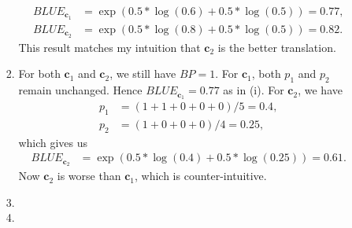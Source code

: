 \documentclass[12pt]{article}
\begin{document}
\begin{enumerate}[label=\textbf{\arabic*.}]
\begin{enumerate}[label=(\alph*)]
\begin{enumerate}[label=\roman*.]
\begin{align*}
        BLUE_{\bm{c}_1}&=\exp(0.5*\log(0.6)+0.5*\log(0.5))=0.77, \\
        BLUE_{\bm{c}_2}&=\exp(0.5*\log(0.8)+0.5*\log(0.5))=0.82.
      \end{align*}
      This result matches my intuition that $\bm{c}_2$ is the better translation.
      \item For both $\bm{c}_1$ and $\bm{c}_2$, we still have $BP=1$. For $\bm{c}_1$, both $p_1$ and $p_2$ remain unchanged. Hence $BLUE_{\bm{c}_1}=0.77$ as in (i). For $\bm{c}_2$, we have
      \begin{align*}
        p_1&=(1+1+0+0+0)/5=0.4, \\
        p_2&=(1+0+0+0)/4=0.25,
      \end{align*}
      which gives us
      \begin{align*}
        BLUE_{\bm{c}_2}&=\exp(0.5*\log(0.4)+0.5*\log(0.25))=0.61.
      \end{align*}
      Now $\bm{c}_2$ is worse than $\bm{c}_1$, which is counter-intuitive.
      \item
      \item
    \end{enumerate}
  \end{enumerate}
\end{enumerate}
\end{document}

